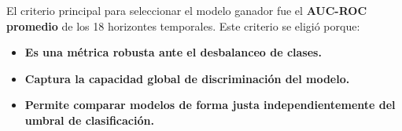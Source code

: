 El criterio principal para seleccionar el modelo ganador fue el \textbf{AUC-ROC promedio} de los 18 horizontes temporales. Este criterio se eligió porque:

\begin{itemize}    
    \item \textbf{Es una métrica robusta ante el desbalanceo de clases.}
    \item \textbf{Captura la capacidad global de discriminación del modelo.}
    \item \textbf{Permite comparar modelos de forma justa independientemente del umbral de clasificación.}
\end{itemize}
